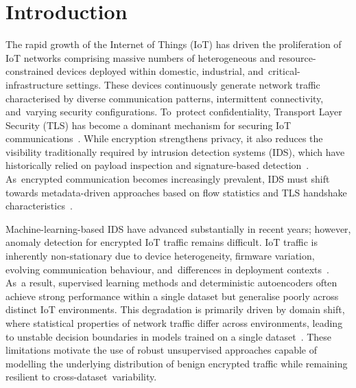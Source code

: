 \documentclass[futureinternet,article,accept,moreauthors]{Definitions/mdpi}
\begin{document}
\section{Introduction}

The rapid growth of the Internet of Things (IoT) has driven the proliferation of IoT networks comprising massive numbers of heterogeneous and resource-constrained devices deployed within domestic, industrial, and~critical-infrastructure settings. These devices continuously generate network traffic characterised by diverse communication patterns, intermittent connectivity, and~varying security configurations. To~protect confidentiality, Transport Layer Security (TLS) has become a dominant mechanism for securing IoT communications~\cite{anderson2016}. While encryption strengthens privacy, it also reduces the visibility traditionally required by intrusion detection systems (IDS), which have historically relied on payload inspection and signature-based detection~\cite{ahmad2021}. As~encrypted communication becomes increasingly prevalent, IDS must shift towards metadata-driven approaches based on flow statistics and TLS handshake characteristics~\cite{rezaei2022, ji2024}.

Machine-learning-based IDS have advanced substantially in recent years; however, anomaly detection for encrypted IoT traffic remains difficult. IoT traffic is inherently non-stationary due to device heterogeneity, firmware variation, evolving communication behaviour, and~differences in deployment contexts~\cite{chandola2009}. As~a result, supervised learning methods and deterministic autoencoders often achieve strong performance within a single dataset but generalise poorly across distinct IoT environments. This degradation is primarily driven by domain shift, where statistical properties of network traffic differ across environments, leading to unstable decision boundaries in models trained on a single dataset~\cite{owoh2024, lopez2017, alaghbari2023}. These limitations motivate the use of robust unsupervised approaches capable of modelling the underlying distribution of benign encrypted traffic while remaining resilient to cross-dataset~variability.
\end{document}
